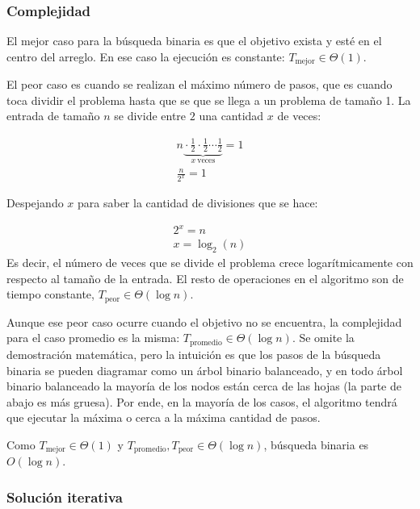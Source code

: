 \subsubsection{Complejidad}

El mejor caso para la búsqueda binaria es que el objetivo exista y esté en el centro del arreglo. En ese caso la ejecución es constante: \(T_\text{mejor} \in \Theta(1)\).

El peor caso es cuando se realizan el máximo número de pasos, que es cuando toca dividir el problema hasta que se que se llega a un problema de tamaño 1. La entrada de tamaño \(n\) se divide entre \(2\) una cantidad \(x\) de veces:

\begin{gather*}
  n \underbrace{{} \cdot \frac{1}{2} \cdot \frac{1}{2} \cdots \frac{1}{2}}_{x \ \text{veces}} = 1 \\
  \frac{n}{2^x} = 1
\end{gather*}

Despejando \(x\) para saber la cantidad de divisiones que se hace:

\begin{gather*}
  2^x = n \\
  x = \log_2(n)
\end{gather*}
Es decir, el número de veces que se divide el problema crece logarítmicamente con respecto al tamaño de la entrada. El resto de operaciones en el algoritmo son de tiempo constante, \(T_\text{peor} \in \Theta(\log n)\). 

Aunque ese peor caso ocurre cuando el objetivo no se encuentra, la complejidad para el caso promedio es la misma: \(T_\text{promedio} \in \Theta(\log n)\). Se omite la demostración matemática, pero la intuición es que los pasos de la búsqueda binaria se pueden diagramar como un árbol binario balanceado, y en todo árbol binario balanceado la mayoría de los nodos están cerca de las hojas (la parte de abajo es más gruesa). Por ende, en la mayoría de los casos, el algoritmo tendrá que ejecutar la máxima o cerca a la máxima cantidad de pasos.

Como \(T_\text{mejor} \in \Theta(1)\) y \(T_\text{promedio}, T_\text{peor} \in \Theta(\log n)\), búsqueda binaria es \(O(\log n)\).

\subsubsection{Solución iterativa}
\label{sec:busqueda_binaria_iterativa}


